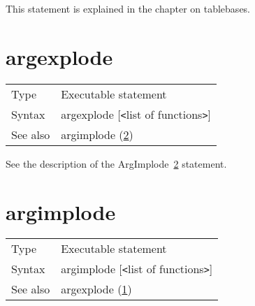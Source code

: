 \noindent This statement is explained in the chapter on 
tablebases.\vspace{10mm}


\section{argexplode}
\label{substaargexplode}

\noindent \begin{tabular}{ll}
Type & Executable statement\\
Syntax & argexplode [{\tt<}list of functions{\tt>}] \\
See also & argimplode (\ref{substaargimplode})
\end{tabular} \vspace{4mm}

\noindent See the description of the ArgImplode~\ref{substaargimplode} 
statement.
\vspace{10mm}


\section{argimplode}
\label{substaargimplode}

\noindent \begin{tabular}{ll}
Type & Executable statement\\
Syntax & argimplode [{\tt<}list of functions{\tt>}] \\
See also & argexplode (\ref{substaargexplode})
\end{tabular} \vspace{4mm}

